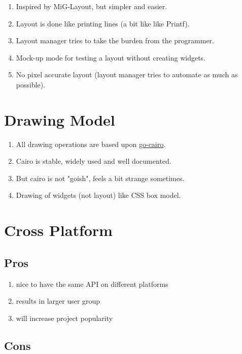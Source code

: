 \documentclass[12pt,a4paper]{article}
\begin{document}
\begin{enumerate}
\item
  Inspired by MiG-Layout, but simpler and easier.
\item
  Layout is done like printing lines (a bit like like Printf).
\item
  Layout manager tries to take the burden from the programmer.
\item
  Mock-up mode for testing a layout without creating widgets.
\item
  No pixel accurate layout (layout manager tries to automate as much as
  possible).
\end{enumerate}


\section{Drawing Model}

\begin{enumerate}
\item
  All drawing operations are based upon
  \href{https://github.com/ungerik/go-cairo}{go-cairo}.
\item
  Cairo is stable, widely used and well documented.
\item
  But cairo is not "goish", feels a bit strange sometimes.
\item
  Drawing of widgets (not layout) like CSS box model.
\end{enumerate}


\section{Cross Platform}

\subsection{Pros}

\begin{enumerate}
\item
  nice to have the same API on different platforms
\item
  results in larger user group
\item
  will increase project popularity
\end{enumerate}

\subsection{Cons}
\end{document}
